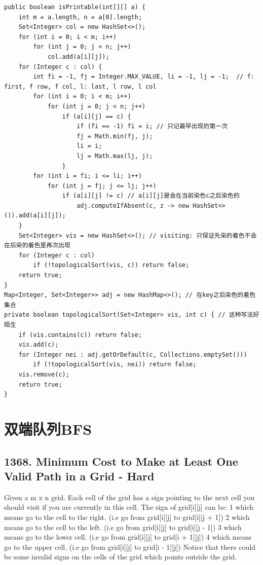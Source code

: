 \documentclass[9pt, b5paaper]{book}
\begin{document}
\begin{enumerate}
\label{sec-1-5-4-2}
\begin{verbatim}
public boolean isPrintable(int[][] a) { 
    int m = a.length, n = a[0].length;
    Set<Integer> col = new HashSet<>();
    for (int i = 0; i < m; i++) 
        for (int j = 0; j < n; j++)
            col.add(a[i][j]);
    for (Integer c : col) {
        int fi = -1, fj = Integer.MAX_VALUE, li = -1, lj = -1;  // f: first, f row, f col, l: last, l row, l col
        for (int i = 0; i < m; i++)
            for (int j = 0; j < n; j++)
                if (a[i][j] == c) {
                    if (fi == -1) fi = i; // 只记最早出现的第一次
                    fj = Math.min(fj, j);
                    li = i;
                    lj = Math.max(lj, j);
                }
        for (int i = fi; i <= li; i++) 
            for (int j = fj; j <= lj; j++) 
                if (a[i][j] != c) // a[i][j]是会在当前染色c之后染色的
                    adj.computeIfAbsent(c, z -> new HashSet<>()).add(a[i][j]);
    }
    Set<Integer> vis = new HashSet<>(); // visiting: 只保证先染的着色不会在后染的着色里再次出现
    for (Integer c : col) 
        if (!topologicalSort(vis, c)) return false;
    return true;
}
Map<Integer, Set<Integer>> adj = new HashMap<>(); // 在key之后染色的着色集合
private boolean topologicalSort(Set<Integer> vis, int c) { // 这种写法好陌生
    if (vis.contains(c)) return false;
    vis.add(c);
    for (Integer nei : adj.getOrDefault(c, Collections.emptySet()))
        if (!topologicalSort(vis, nei)) return false;
    vis.remove(c);
    return true;
}
\end{verbatim}
\end{enumerate}


\section{双端队列BFS}
\label{sec-1-6}
\subsection{1368. Minimum Cost to Make at Least One Valid Path in a Grid - Hard}
\label{sec-1-6-1}
Given a m x n grid. Each cell of the grid has a sign pointing to the next cell you should visit if you are currently in this cell. The sign of grid[i][j] can be:
1 which means go to the cell to the right. (i.e go from grid[i][j] to grid[i][j + 1])
2 which means go to the cell to the left. (i.e go from grid[i][j] to grid[i][j - 1])
3 which means go to the lower cell. (i.e go from grid[i][j] to grid[i + 1][j])
4 which means go to the upper cell. (i.e go from grid[i][j] to grid[i - 1][j])
Notice that there could be some invalid signs on the cells of the grid which points outside the grid.
\end{document}
